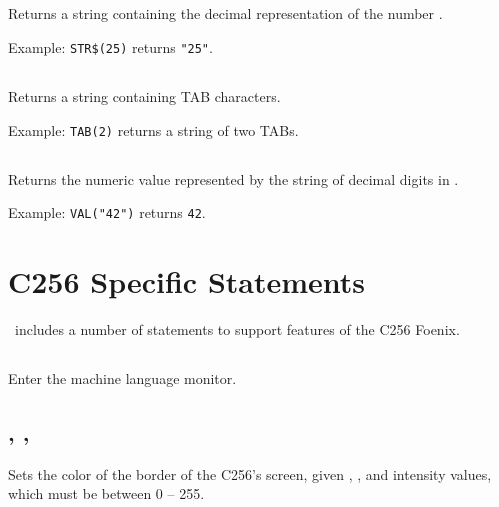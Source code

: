 \documentclass{article}
\begin{document}
    \subsection{}

    Returns a string containing the decimal representation of the number .
    
    Example: \verb+STR$(25)+ returns \verb+"25"+.

    \subsection{}

    Returns a string containing  TAB characters.
    
    Example: \verb+TAB(2)+ returns a string of two TABs.

    \subsection{}

    Returns the numeric value represented by the string of decimal digits in .
    
    Example: \verb+VAL("42")+ returns \verb+42+.

    \section{C256 Specific Statements}

    \BASIC\ includes a number of statements to support features of the C256 Foenix.

    \subsection{}

    Enter the machine language monitor.

    \subsection{ , , }

    Sets the color of the border of the C256's screen, given
    , , and  intensity values, which must be
    between 0 -- 255.

    \subsection{ }
\end{document}

